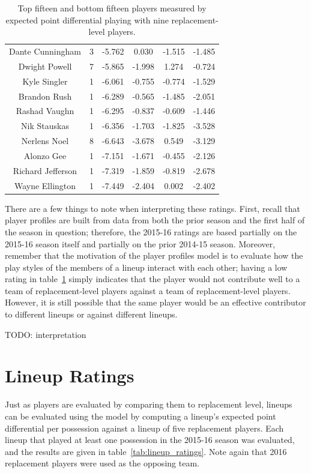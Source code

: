 \begin{table}
{\begin{tabular}{cccccc}
  Dante Cunningham &       3 &  -5.762 &  0.030 & -1.515 & -1.485 \\
     Dwight Powell &       7 &  -5.865 & -1.998 &  1.274 & -0.724 \\
      Kyle Singler &       1 &  -6.061 & -0.755 & -0.774 & -1.529 \\
      Brandon Rush &       1 &  -6.289 & -0.565 & -1.485 & -2.051 \\
     Rashad Vaughn &       1 &  -6.295 & -0.837 & -0.609 & -1.446 \\
      Nik Stauskas &       1 &  -6.356 & -1.703 & -1.825 & -3.528 \\
      Nerlens Noel &       8 &  -6.643 & -3.678 &  0.549 & -3.129 \\
        Alonzo Gee &       1 &  -7.151 & -1.671 & -0.455 & -2.126 \\
 Richard Jefferson &       1 &  -7.319 & -1.859 & -0.819 & -2.678 \\
   Wayne Ellington &       1 &  -7.449 & -2.404 &  0.002 & -2.402 \\
            \bottomrule
        \end{tabular}
    }
    \caption{Top fifteen and bottom fifteen players measured by expected point
    differential playing with nine replacement-level players.}
    \label{tab:player_ratings}
\end{table}

There are a few things to note when interpreting these ratings. First, recall that
player profiles are built from data from both the prior season and the first half of
the season in question; therefore, the 2015-16 ratings are based partially on the
2015-16 season itself and partially on the prior 2014-15 season.  Moreover, remember
that the motivation of the player profiles model is to evaluate how the play styles
of the members of a lineup interact with each other; having a low rating in
table~\ref{tab:player_ratings} simply indicates that the player would not contribute
well to a team of replacement-level players against a team of replacement-level
players.  However, it is still possible that the same player would be an effective
contributor to different lineups or against different lineups.

TODO: interpretation

\section{Lineup Ratings}

Just as players are evaluated by comparing them to replacement level, lineups can be
evaluated using the model by computing a lineup's expected point differential per
possession against a lineup of five replacement players. Each lineup that played at
least one possession in the 2015-16 season was evaluated, and the results are given
in table~\ref{tab:lineup_ratings}. Note again that 2016 replacement players were
used as the opposing team.


